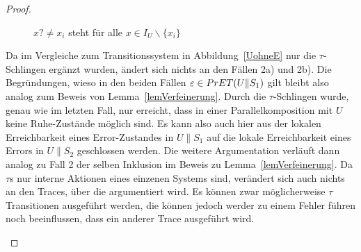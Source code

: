 \begin{proof}
\begin{itemize}
\begin{figure} [h!tbp]
\begin{center}
        \caption{$x?\neq x_i$ steht für alle $x\in I_U\backslash\{x_i\}$}
        \label{UohneEmitTau}
      \end{center}
      \end{figure}
      Da im Vergleiche zum Transitionssystem in Abbildung~\ref{UohneE} nur die
      $\tau$-Schlingen ergänzt wurden, ändert sich nichts an den Fällen 2a) und
      2b). Die Begründungen, wieso in den beiden Fällen $\varepsilon\in
      PrET{}(U\|S_1)$ gilt bleibt also analog zum Beweis von
      Lemma~\ref{lemVerfeinerung}. Durch die $\tau$-Schlingen wurde, genau wie
      im letzten Fall, nur erreicht, dass in einer Parallelkomposition mit $U$
      keine Ruhe-Zustände möglich sind. Es kann also auch hier aus der lokalen
      Erreichbarkeit eines Error-Zustandes in $U\|S_1$ auf die lokale
      Erreichbarkeit eines Errors in $U\|S_2$ geschlossen werden. Die weitere
      Argumentation verläuft dann analog zu Fall 2 der selben Inklusion im
      Beweis zu Lemma~\ref{lemVerfeinerung}. Da $\tau$s nur interne Aktionen
      eines einzenen Systems sind, verändert sich auch nichts an den Traces,
      über die argumentiert wird. Es können zwar möglicherweise $\tau$
      Transitionen ausgeführt werden, die können jedoch werder zu einem Fehler
      führen noch beeinflussen, dass ein anderer Trace ausgeführt wird.
  \end{itemize}


\end{proof}
